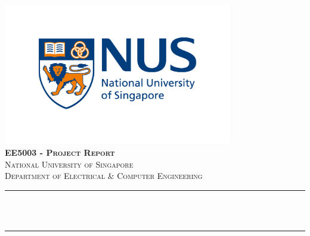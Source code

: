 \begin{titlepage}

\newcommand{\HRule}{\rule{\linewidth}{0.5mm}} %





\begin{center} %


\includegraphics[width = 10cm]{./figures/nus}\\[1.0cm] 
\textbf{\textsc{\Large EE5003 - Project Report}}\\[1.0cm] 
\textsc{\Large National University of Singapore}\\[0.5cm] 
\textsc{\large Department of Electrical \& Computer Engineering}\\[0.95cm] 


\HRule \\[0.4cm]
{ \LARGE \bfseries \reporttitle}\\ %
\HRule \\[1.5cm]
\end{center}


\end{titlepage}
